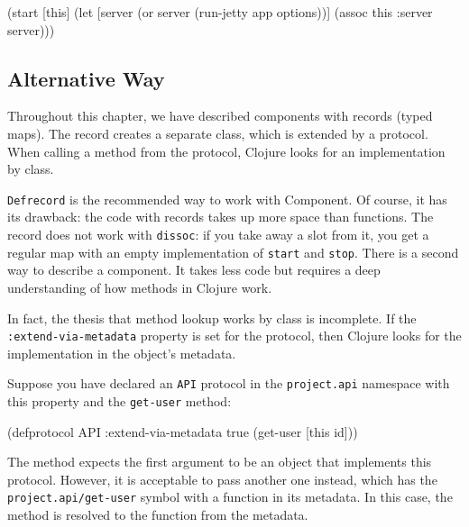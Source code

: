 \else

\begin{english}
  \begin{clojure}
(start [this]
  (let [server (or server
                   (run-jetty app options))]
    (assoc this :server server)))
  \end{clojure}
\end{english}

\fi

\subsection{Alternative Way}

Throughout this chapter, we have described components with records (typed maps). The record creates a separate class, which is extended by a protocol. When calling a method from the protocol, Clojure looks for an implementation by class.


\verb|Defrecord| is the recommended way to work with Component. Of course, it has its drawback: the code with records takes up more space than functions. The record does not work with \verb|dissoc|: if you take away a slot from it, you get a regular map with an empty implementation of \verb|start| and \verb|stop|. There is a second way to describe a component. It takes less code but requires a deep understanding of how methods in Clojure work.

In fact, the thesis that method lookup works by class is incomplete. If the \verb|:extend-via-metadata| property is set for the protocol, then Clojure looks for the implementation in the object's metadata.

Suppose you have declared an \verb|API| protocol in the \verb|project.api| namespace with this property and the \verb|get-user| method:

\begin{english}
  \begin{clojure}
(defprotocol API
  :extend-via-metadata true
  (get-user [this id]))
  \end{clojure}
\end{english}

The method expects the first argument to be an object that implements this protocol. However, it is acceptable to pass another one instead, which has the \verb|project.api/get-user| symbol with a function in its metadata. In this case, the method is resolved to the function from the metadata.

